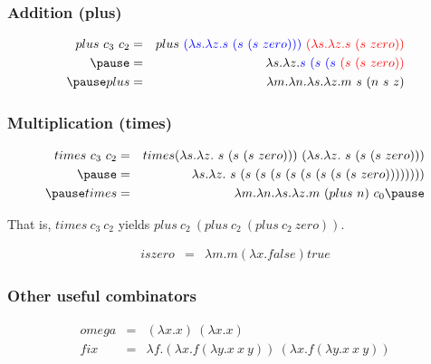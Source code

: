 \documentclass{beamer}
\begin{document}
\begin{frame}
\frametitle{Addition (plus)} 

 \begin{eqnarray*} 
   plus\ c_3\ c_2 & = & plus\ {\color{blue}(\lambda s.\lambda z. s\ (s\ (s\ zero)))}\ 
                              {\color{red}(\lambda s. \lambda z. s\ (s\ zero))} \\  \pause
                  & = & \lambda s. \lambda z. {\color{blue}s\ (s\ (s} {\color{red}\ (s\ (s\ zero))} \\ \pause 
   plus & = & \lambda m . \lambda n . \lambda s . \lambda z . m\ s\ (n\ s\ z) 
 \end{eqnarray*} 

\end{frame}

\begin{frame}
 \frametitle{Multiplication (times)} 

 \begin{eqnarray*} 
   times\ c_3\ c_2 & = & times (\lambda s . \lambda z .\ s\ (s\ (s\ zero)))\ 
                               (\lambda s . \lambda z .\ s\ (s\ (s\ zero))) \\ \pause
                   & = & \lambda s . \lambda z .\ s\ (s\ (s\ (s\ (s\ (s\ (s\ (s\ (s\ zero)))))))) \\ \pause  
   times & = & \lambda m . \lambda n . \lambda s . \lambda z . m\ (plus\ n)\ c_0 \pause
 \end{eqnarray*} 

  That is, $times\ c_3\ c_2$ yields $plus\ c_2\ (plus\ c_2\ (plus\ c_2\ zero))$.   \pause 

  \begin{eqnarray*}
   iszero & = & \lambda m . m (\lambda x . false) true 
  \end{eqnarray*} 
 
\end{frame}

\begin{frame}
\frametitle{Other useful combinators}

\begin{eqnarray*}
 omega & = & (\lambda x . x)\ (\lambda x . x) \\
 fix & = & \lambda f . (\lambda x . f (\lambda y . x\ x\ y))\ (\lambda x . f (\lambda y . x\ x\ y))
\end{eqnarray*}
\end{frame}

\begin{frame}
\titlepage
\end{frame}
\end{document}
